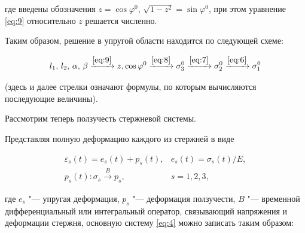где введены обозначения $z = \cos{\varphi^{0}}$, $\sqrt{1-z^2}=\sin{\varphi^{0}}$, при этом уравнение \eqref{eq:9} относительно $z$ решается численно.



Таким образом, решение в упругой области находится по следующей схеме:

\begin{equation}

\label{eq:10}

l_1,\,l_2,\,\alpha,\,\beta

\xrightarrow{\eqref{eq:9}}


z, \cos{\varphi^{0}}

\xrightarrow{\eqref{eq:8}}


\sigma_{3}^{0}

\xrightarrow{\eqref{eq:7}}


\sigma_{2}^{0}

\xrightarrow{\eqref{eq:6}}


\sigma_{1}^{0}

\end{equation}

(здесь и далее стрелки  означают формулы, по которым вычисляются последующие величины).



Рассмотрим теперь ползучесть стержневой системы. 

Представляя полную деформацию каждого из стержней в виде

\begin{equation}

\label{eq:11}

\begin{array}{rl}

\varepsilon_s (t) = e_s (t) + p_s (t), & e_s(t) = \sigma_s (t) / E, \\

 p_s (t): \sigma_s \xrightarrow{B} p_s, &  s=1,2,3, 

\end{array}

\end{equation}

где $e_s$ "--- упругая деформация, $p_s$ "--- деформация ползучести, $B$ "--- временной дифференциальный или интегральный оператор, связывающий напряжения и деформации стержня, основную систему \eqref{eq:4} можно записать таким образом:

